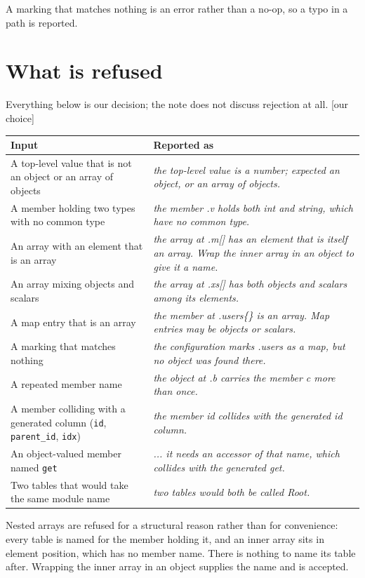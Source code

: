 \documentclass[11pt,a4paper]{article}
\newcommand{\ourcall}{\textcolor{ours}{\textsf{[our choice]}}}
\begin{document}
A marking that matches nothing is an error rather than a no-op, so a typo in a
path is reported.

\section{What is refused}

Everything below is our decision; the note does not discuss rejection at all.
\ourcall{}

\begin{center}
\begin{tabular}{@{}p{5.4cm}p{8.2cm}@{}}
\hline
\textbf{Input} & \textbf{Reported as} \\
\hline
A top-level value that is not an object or an array of objects &
  \emph{the top-level value is a number; expected an object, or an array of
  objects.} \\
A member holding two types with no common type &
  \emph{the member .v holds both int and string, which have no common type.} \\
An array with an element that is an array &
  \emph{the array at .m[] has an element that is itself an array. Wrap the
  inner array in an object to give it a name.} \\
An array mixing objects and scalars &
  \emph{the array at .xs[] has both objects and scalars among its elements.} \\
A map entry that is an array &
  \emph{the member at .users\{\} is an array. Map entries may be objects or
  scalars.} \\
A marking that matches nothing &
  \emph{the configuration marks .users as a map, but no object was found
  there.} \\
A repeated member name &
  \emph{the object at .b carries the member c more than once.} \\
A member colliding with a generated column (\texttt{id}, \texttt{parent\_id},
\texttt{idx}) &
  \emph{the member id collides with the generated id column.} \\
An object-valued member named \texttt{get} &
  \emph{... it needs an accessor of that name, which collides with the
  generated get.} \\
Two tables that would take the same module name &
  \emph{two tables would both be called Root.} \\
\hline
\end{tabular}
\end{center}

\noindent
Nested arrays are refused for a structural reason rather than for
convenience: every table is named for the member holding it, and an inner
array sits in element position, which has no member name. There is nothing to
name its table after. Wrapping the inner array in an object supplies the name
and is accepted.
\end{document}

